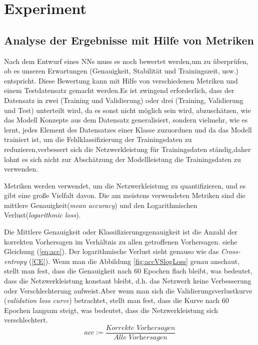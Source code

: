 \documentclass[12pt,a4paper]{scrartcl}
\numberwithin{equation}{section}
\begin{document}
\section{Experiment} \label{Experiment}

\subsection{Analyse der Ergebnisse mit Hilfe von Metriken}
Nach dem Entwurf eines \acsp{NN} muss es noch bewertet werden,um zu überprüfen, ob es unseren Erwartungen (Genauigkeit, Stabilität und Trainingszeit, usw.) entspricht. Diese Bewertung kann mit Hilfe von verschiedenen Metriken und einem Testdatensatz gemacht werden.Es ist zwingend erforderlich, dass der Datensatz in zwei (Training und Validierung) oder drei (Training, Validierung und Test) unterteilt wird, da es sonst nicht möglich sein wird, abzuschätzen, wie das Modell Konzepte aus dem Datensatz generalisiert, sondern vielmehr, wie es lernt, jedes Element des Datensatzes einer Klasse zuzuordnen und da das Modell trainiert ist, um die Fehlklassifizierung der Trainingsdaten zu reduzieren,verbessert sich die Netzwerkleistung für Trainingsdaten ständig,daher lohnt es sich nicht zur Abschätzung der Modellleistung die Trainingsdaten zu verwenden.

Metriken werden verwendet, um die Netzwerkleistung zu quantifizieren, und es gibt eine große Vielfalt davon. Die am meistens verwendeten Metriken sind  die mittlere Genauigkeit(\textit{mean accuracy}) und den Logarithmischen Verlust(\textit{logarithmic loss}).

Die Mittlere Genauigkeit oder Klassifizierungsgenauigkeit ist die Anzahl der korrekten Vorhersagen im Verhältnis zu allen getroffenen Vorhersagen. siehe Gleichung (\ref{eq:acc}).
Der logarithmische Verlust sieht genauso wie das \textit{Cross-entropy} (\ref{CE}). Wenn man die Abbildung \ref{fig:accVSlogLoss} genau anschaut, stellt man fest, dass die Genauigkeit nach 60 Epochen flach bleibt, was bedeutet, dass die Netzwerkleistung konstant bleibt, d.h. das Netzwerk keine Verbesserung oder Verschlechterung aufweist.Aber wenn man sich die Validierungsverlustkurve  (\textit{validation loss curve}) betrachtet, stellt man fest, dass die Kurve nach 60 Epochen langsam steigt, was bedeutet, dass die Netzwerkleistung sich verschlechtert.
\begin{equation}\label{eq:acc}
	acc := \dfrac{\textit{Korrekte Vorhersagen}}{\textit{Alle Vorhersagen}}
\end{equation}
\end{document}
